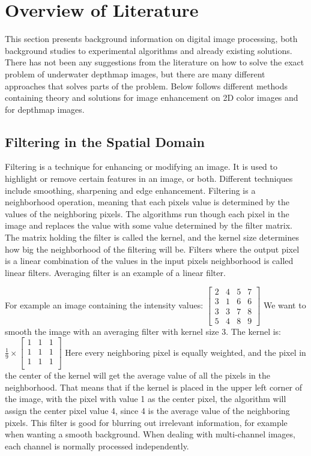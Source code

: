 \section{Overview of Literature}\label{overview}
This section presents background information on digital image processing, both background studies to experimental algorithms and already existing solutions. There has not been any suggestions from the literature on how to solve the exact problem of underwater depthmap images, but there are many different approaches that solves parts of the problem.
Below follows different methods containing theory and solutions for image enhancement on 2D color images and for depthmap images.


\subsection{Filtering in the Spatial Domain}

Filtering is a technique for enhancing or modifying an image. It is used to highlight or remove certain features in an image, or both. Different techniques include smoothing, sharpening and edge enhancement. 
Filtering is a neighborhood operation, meaning that each pixels value is determined by the values of the neighboring pixels. The algorithms run though each pixel in the image and replaces the value with some value determined by the filter matrix. The matrix holding the filter is called the kernel, and the kernel size determines how big the neighborhood of the filtering will be. Filters where the output pixel is a linear combination of the values in the input pixels neighborhood is called linear filters. Averaging filter is an example of a linear filter.

For example an image containing the intensity values: 
$\begin{bmatrix}
    2 & 4 & 5 & 7 \\
    3 & 1 & 6 & 6 \\
    3 & 3 & 7 & 8 \\
    5 & 4 & 8 & 9 
\end{bmatrix}$
We want to smooth the image with an averaging filter with kernel size 3. The kernel is: 
$\frac{1}{9} \times 
\begin{bmatrix}
    1 & 1 & 1 \\
    1 & 1 & 1 \\
    1 & 1 & 1 \\
\end{bmatrix}$
Here every neighboring pixel is equally weighted, and the pixel in the center of the kernel will get the average value of all the pixels in the neighborhood. That means that if the kernel is placed in the upper left corner of the image, with the pixel with value 1 as the center pixel, the algorithm will assign the center pixel value 4, since 4 is the average value of the neighboring pixels.
This filter is good for blurring out irrelevant information, for example when wanting a smooth background.
When dealing with multi-channel images, each channel is normally processed independently.

